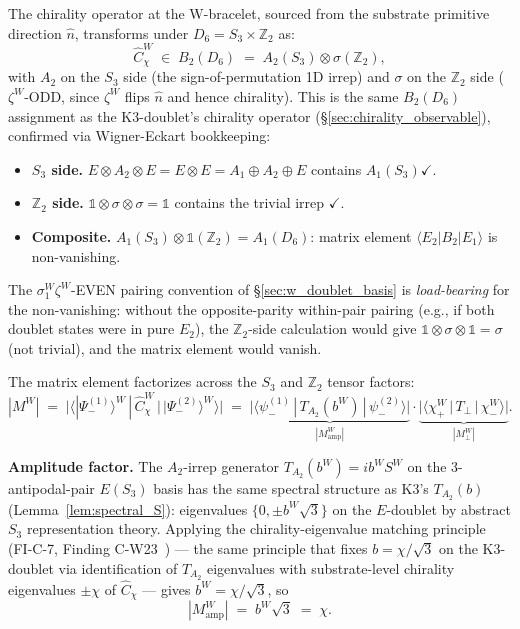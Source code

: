 \documentclass[11pt,letterpaper]{article}
\newcommand{\Cchi}{\hat{C}_\chi}
\newcommand{\PsiminusOne}{|\Psi_-^{(1)}\rangle}
\newcommand{\PsiminusTwo}{|\Psi_-^{(2)}\rangle}
\newcommand{\Dsix}{D_6}
\newcommand{\Sthree}{S_3}
\begin{document}
The chirality operator at the W-bracelet, sourced from the substrate primitive direction $\hat{n}$, transforms under $\Dsix = \Sthree \times \mathbb{Z}_2$ as:
\[
\Cchi^W \;\in\; B_2(\Dsix) \;=\; A_2(\Sthree) \otimes \sigma(\mathbb{Z}_2),
\]
with $A_2$ on the $\Sthree$ side (the sign-of-permutation 1D irrep) and $\sigma$ on the $\mathbb{Z}_2$ side ($\zeta^W$-ODD, since $\zeta^W$ flips $\hat{n}$ and hence chirality). This is the same $B_2(\Dsix)$ assignment as the K3-doublet's chirality operator (\S\ref{sec:chirality_observable}), confirmed via Wigner-Eckart bookkeeping:
\begin{itemize}\setlength\itemsep{0.2em}
    \item \textbf{$\Sthree$ side.} $E \otimes A_2 \otimes E = E \otimes E = A_1 \oplus A_2 \oplus E$ contains $A_1(\Sthree) \checkmark$.
    \item \textbf{$\mathbb{Z}_2$ side.} $\mathbb{1} \otimes \sigma \otimes \sigma = \mathbb{1}$ contains the trivial irrep $\checkmark$.
    \item \textbf{Composite.} $A_1(\Sthree) \otimes \mathbb{1}(\mathbb{Z}_2) = A_1(\Dsix)$: matrix element $\langle E_2 | B_2 | E_1 \rangle$ is non-vanishing.
\end{itemize}
The $\sigma_1^W \zeta^W$-EVEN pairing convention of \S\ref{sec:w_doublet_basis} is \emph{load-bearing} for the non-vanishing: without the opposite-parity within-pair pairing (e.g., if both doublet states were in pure $E_2$), the $\mathbb{Z}_2$-side calculation would give $\mathbb{1} \otimes \sigma \otimes \mathbb{1} = \sigma$ (not trivial), and the matrix element would vanish.

The matrix element factorizes across the $\Sthree$ and $\mathbb{Z}_2$ tensor factors:
\begin{equation}\label{eq:w_matrix_element_factorization}
|M^W| \;=\; \bigl|\langle \PsiminusOne^W \,|\, \Cchi^W \,|\, \PsiminusTwo^W \rangle\bigr| \;=\; \underbrace{\bigl|\langle \psi_-^{(1)} \,|\, T_{A_2}(b^W) \,|\, \psi_-^{(2)} \rangle\bigr|}_{|M_{\text{amp}}^W|} \cdot \underbrace{\bigl|\langle \chi_+^W \,|\, T_\perp \,|\, \chi_-^W \rangle\bigr|}_{|M_\perp^W|}.
\end{equation}

\textbf{Amplitude factor.} The $A_2$-irrep generator $T_{A_2}(b^W) = i b^W S^W$ on the 3-antipodal-pair $E(\Sthree)$ basis has the same spectral structure as K3's $T_{A_2}(b)$ (Lemma~\ref{lem:spectral_S}): eigenvalues $\{0, \pm b^W \sqrt{3}\}$ on the $E$-doublet by abstract $\Sthree$ representation theory. Applying the chirality-eigenvalue matching principle (FI-C-7, Finding C-W23~\cite{abshier_capotauro_subclaim_c_sketch}) --- the same principle that fixes $b = \chi/\sqrt{3}$ on the K3-doublet via identification of $T_{A_2}$ eigenvalues with substrate-level chirality eigenvalues $\pm\chi$ of $\Cchi$ --- gives $b^W = \chi/\sqrt{3}$, so
\begin{equation}\label{eq:w_amplitude_factor}
|M_{\text{amp}}^W| \;=\; b^W \sqrt{3} \;=\; \chi.
\end{equation}
\end{document}
